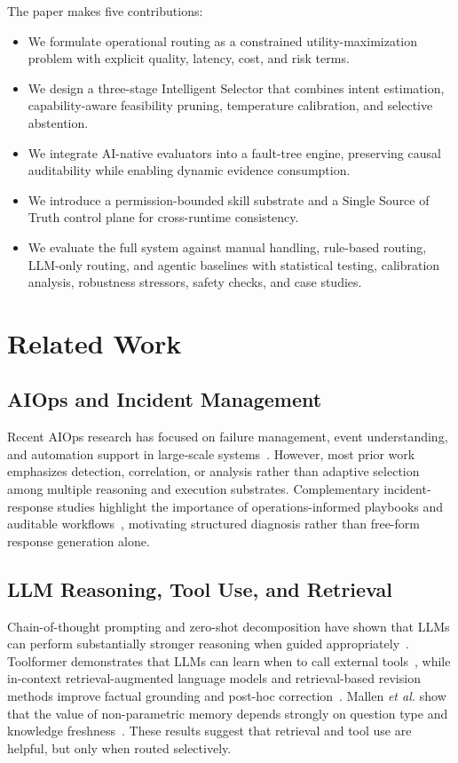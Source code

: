\documentclass[conference]{IEEEtran}
\begin{document}
The paper makes five contributions:
\begin{itemize}
    \item We formulate operational routing as a constrained utility-maximization problem with explicit quality, latency, cost, and risk terms.
    \item We design a three-stage Intelligent Selector that combines intent estimation, capability-aware feasibility pruning, temperature calibration, and selective abstention.
    \item We integrate AI-native evaluators into a fault-tree engine, preserving causal auditability while enabling dynamic evidence consumption.
    \item We introduce a permission-bounded skill substrate and a Single Source of Truth control plane for cross-runtime consistency.
    \item We evaluate the full system against manual handling, rule-based routing, LLM-only routing, and agentic baselines with statistical testing, calibration analysis, robustness stressors, safety checks, and case studies.
\end{itemize}

\section{Related Work}
\subsection{AIOps and Incident Management}
Recent AIOps research has focused on failure management, event understanding, and automation support in large-scale systems~\cite{notaro2021aiops}. However, most prior work emphasizes detection, correlation, or analysis rather than adaptive selection among multiple reasoning and execution substrates. Complementary incident-response studies highlight the importance of operations-informed playbooks and auditable workflows~\cite{shaked2023operations}, motivating structured diagnosis rather than free-form response generation alone.

\subsection{LLM Reasoning, Tool Use, and Retrieval}
Chain-of-thought prompting and zero-shot decomposition have shown that LLMs can perform substantially stronger reasoning when guided appropriately~\cite{wei2022cot,kojima2022zeroshot}. Toolformer demonstrates that LLMs can learn when to call external tools~\cite{schick2023toolformer}, while in-context retrieval-augmented language models and retrieval-based revision methods improve factual grounding and post-hoc correction~\cite{ram2023incontext,gao2023rarr}. Mallen \emph{et al.} show that the value of non-parametric memory depends strongly on question type and knowledge freshness~\cite{mallen2023trust}. These results suggest that retrieval and tool use are helpful, but only when routed selectively.
\end{document}
